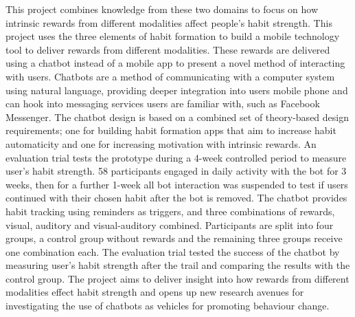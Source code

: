 This project combines knowledge from these two domains to focus on how intrinsic rewards from different modalities affect people's habit strength.\newline
\newline
This project uses the three elements of habit formation to build a mobile technology tool to deliver rewards from different modalities.
These rewards are delivered using a chatbot instead of a mobile app to present a novel method of interacting with users.
Chatbots are a method of communicating with a computer system using natural language, providing deeper integration into users mobile phone and
can hook into messaging services users are familiar with, such as Facebook Messenger.
The chatbot design is based on a combined set of theory-based design requirements;
one for building habit formation apps that aim to increase habit automaticity and one for increasing motivation with intrinsic rewards.\newline
\newline
An evaluation trial tests the prototype during a 4-week controlled period to measure user's habit strength.
58 participants engaged in daily activity with the bot for 3 weeks, then for a further 1-week all bot interaction was suspended to test if users continued with their chosen habit after the bot is removed.
The chatbot provides habit tracking using reminders as triggers, and three combinations of rewards, visual, auditory and visual-auditory combined.
Participants are split into four groups, a control group without rewards and the remaining three groups receive one combination each.
The evaluation trial tested the success of the chatbot by measuring user's habit strength after the trail and comparing the results with the control group.\newline
\newline
The project aims to deliver insight into how rewards from different modalities effect habit strength and opens up new research avenues for investigating the use of chatbots as
vehicles for promoting behaviour change.

